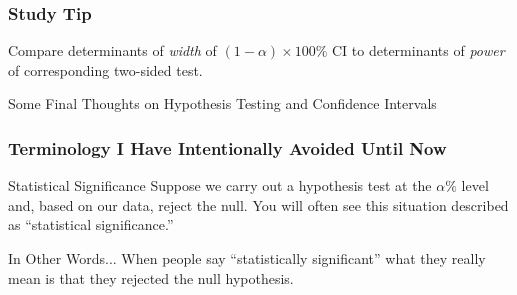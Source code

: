 \documentclass[handout]{beamer}
\begin{document}
\begin{frame}
\frametitle{Study Tip}
		Compare determinants of \emph{width} of $(1- \alpha)\times100\%$ CI to determinants of \emph{power} of corresponding two-sided test.
\end{frame}
\begin{frame}
\begin{center}
	\huge Some Final Thoughts on Hypothesis Testing and Confidence Intervals
\end{center}
\end{frame}
\begin{frame}
\frametitle{Terminology I Have Intentionally Avoided Until Now}

\begin{block}{Statistical Significance}
Suppose we carry out a hypothesis test at the $\alpha\%$ level and,  based on our data, reject the null. You will often see this situation described as ``statistical significance.''
\end{block}

\begin{block}{In Other Words...}
When people say ``statistically significant'' what they really mean is that they rejected the null hypothesis.
\end{block}
\end{frame}
\end{document}
